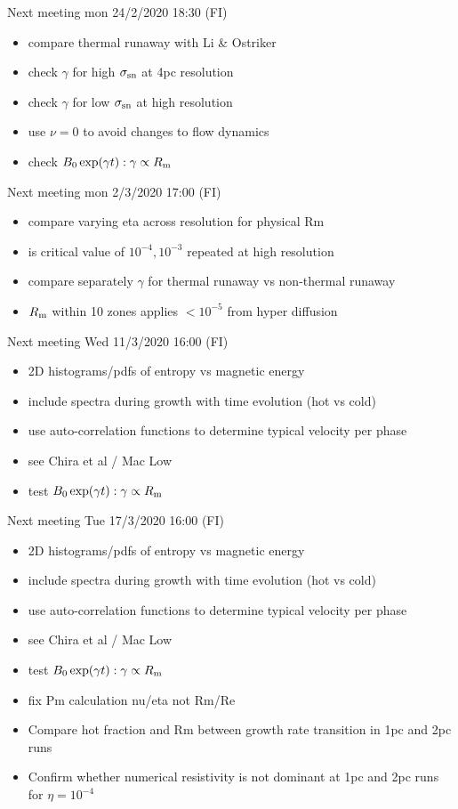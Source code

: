 \documentclass[iop,apj,numberedappendix,twocolappendix]{emulateapj}
\begin{document}
Next meeting mon 24/2/2020 18:30 (FI)
\begin{itemize} 
\item compare thermal runaway with Li \& Ostriker 
\item check $\gamma$ for high $\sigma_{\rm sn}$ at 4pc resolution
\item check $\gamma$ for low $\sigma_{\rm sn}$ at high resolution
\item use $\nu = 0$ to avoid changes to flow dynamics
\item check $B_0\exp(\gamma t): \gamma\propto R_{\rm m}$
\end{itemize} 

Next meeting mon 2/3/2020 17:00 (FI)
\begin{itemize} 
\item compare varying eta across resolution for physical Rm 
\item is critical value of $10^{-4}, 10^{-3}$ repeated at high resolution
\item compare separately $\gamma$ for thermal runaway vs non-thermal runaway
\item $R_{\rm m}$ within 10 zones applies $<10^{-5}$ from hyper diffusion
\end{itemize} 

Next meeting Wed 11/3/2020 16:00 (FI)
\begin{itemize} 
\item 2D histograms/pdfs of entropy vs magnetic energy
\item include spectra during growth with time evolution (hot vs cold)
\item use auto-correlation functions to determine typical velocity per phase
\item see Chira et al / Mac Low
\item test $B_0\exp(\gamma t): \gamma\propto R_{\rm m}$
\end{itemize} 

Next meeting Tue 17/3/2020 16:00 (FI)
\begin{itemize} 
\item 2D histograms/pdfs of entropy vs magnetic energy
\item include spectra during growth with time evolution (hot vs cold)
\item use auto-correlation functions to determine typical velocity per phase
\item see Chira et al / Mac Low
\item test $B_0\exp(\gamma t): \gamma\propto R_{\rm m}$
\item fix Pm calculation nu/eta not Rm/Re
\item Compare hot fraction and Rm between growth rate transition in 1pc and 2pc runs
\item Confirm whether numerical resistivity is not dominant at 1pc and 2pc runs for $\eta=10^{-4}$
\end{itemize} 
\end{document}
